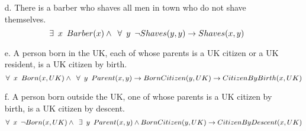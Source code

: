 \documentclass[11pt]{article}
\begin{document}
\begin{flushleft}
\begin{enumerate}
    \item[d.] There is a barber who shaves all men in town who do not shave
        themselves.
        $$ \exists \hspace{0.5em} x \hspace{0.5em} Barber(x) \wedge
        \hspace{0.5em} \forall \hspace{0.5em} y \hspace{0.5em} \neg Shaves(y,
        y) \rightarrow Shaves(x, y) $$

    \item[e.] A person born in the UK, each of whose parents is a UK
        citizen or a UK resident, is a UK citizen by birth.
        $$ \forall \hspace{0.5em} x \hspace{0.5em} Born(x, UK) \wedge
        \hspace{0.5 em} \forall \hspace{0.5em} y \hspace{0.5em} Parent(x, y)
        \rightarrow BornCitizen(y, UK) \rightarrow CitizenByBirth(x, UK) $$

    \item[f.] A person born outside the UK, one of whose parents is a UK
        citizen by birth, is a UK citizen by descent.
        $$ \forall \hspace{0.5em} x \hspace{0.5em} \neg Born(x, UK) \wedge
        \hspace{0.5em} \exists \hspace{0.5em} y \hspace{0.5em} Parent(x, y)
        \wedge BornCitizen(y, UK) \rightarrow CitizenByDescent(x, UK) $$


\end{enumerate}
\end{flushleft}
\end{document}
